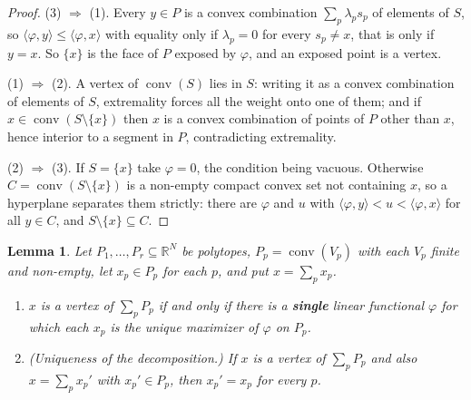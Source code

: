 \documentclass[11pt, a4paper, abstract=yes]{scrartcl}
\theoremstyle{definition}
\theoremstyle{remark}
\theoremstyle{plain}
\newtheorem{lemma}[definition]{Lemma}
\newcommand{\conv}{\operatorname{conv}}
\begin{document}
\begin{proof}
(3) \(\Rightarrow\) (1). Every \(y\in P\) is a convex combination \(\sum_p\lambda_ps_p\) of elements
of \(S\), so \(\langle\varphi,y\rangle\le\langle\varphi,x\rangle\) with equality only if
\(\lambda_p=0\) for every \(s_p\ne x\), that is only if \(y=x\). So \(\lbrace x\rbrace\) is the face
of \(P\) exposed by \(\varphi\), and an exposed point is a vertex.

(1) \(\Rightarrow\) (2). A vertex of \(\conv(S)\) lies in \(S\): writing it as a convex combination
of elements of \(S\), extremality forces all the weight onto one of them; and if
\(x\in\conv(S\setminus\lbrace x\rbrace)\) then \(x\) is a convex combination of points of \(P\) other
than \(x\), hence interior to a segment in \(P\), contradicting extremality.

(2) \(\Rightarrow\) (3). If \(S=\lbrace x\rbrace\) take \(\varphi=0\), the condition being vacuous.
Otherwise \(C=\conv(S\setminus\lbrace x\rbrace)\) is a non-empty compact convex set not containing
\(x\), so a hyperplane separates them strictly: there are \(\varphi\) and \(u\) with
\(\langle\varphi,y\rangle<u<\langle\varphi,x\rangle\) for all \(y\in C\), and
\(S\setminus\lbrace x\rbrace\subseteq C\).
\end{proof}

\begin{lemma}
Let \(P_1,\dots,P_r\subseteq\mathbb R^N\) be polytopes, \(P_p=\conv(V_p)\) with each \(V_p\)
finite and non-empty, let \(x_p\in P_p\) for each \(p\), and put \(x=\sum_px_p\).
\begin{enumerate}
\item \(x\) is a vertex of \(\sum_pP_p\) if and only if there is a \textbf{single} linear functional
\(\varphi\) for which each \(x_p\) is the \emph{unique} maximizer of \(\varphi\) on \(P_p\).
\item \emph{(Uniqueness of the decomposition.)} If \(x\) is a vertex of \(\sum_pP_p\) and also
\(x=\sum_px_p'\) with \(x_p'\in P_p\), then \(x_p'=x_p\) for every \(p\).
\end{enumerate}
\label{lem:vertexdecomp}
\label{lem-vertexdecomp}
\end{lemma}
\end{document}
